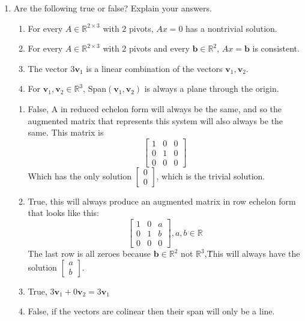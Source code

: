 \documentclass[12pt,a4paper]{exam}
\newcommand{\bb}{\mathbf{b}}
\newcommand{\bv}{\mathbf{v}}
\newcommand{\R}{\mathbb{R}}
\begin{document}
\begin{enumerate}
\item
 Are the following true or false? Explain your answers.
\begin{enumerate}
\item
 For every $A\in\R^{2\times 3}$ with $2$ pivots, $Ax=0$ has a nontrivial solution.
  
\item
 For every $A\in\R^{2\times 3}$ with $2$ pivots and every $\bb\in\R^2$, $Ax=\bb$ is consistent.

\item
 The vector $3\bv_1$ is a linear combination of the vectors $\bv_1,\bv_2$.

\item
 For $\bv_1,\bv_2\in\mathbb{R}^3$, Span$(\bv_1,\bv_2)$ is always a plane 
 through the origin.
\end{enumerate}


\begin{solution}
  \begin{enumerate}
    \item False, A in reduced echelon form will always be the same, and so the augmented matrix that represents this system will also always be the same. This matrix is $$\left[\begin{matrix}1&0&0\\0&1&0\\0&0&0 \end{matrix}\right]$$
          Which has the only solution $\left[\begin{matrix} 0\\0 \end{matrix}\right]$, which is the trivial solution.
    \item True, this will always produce an augmented matrix in row echelon form that looks like this: $$\left[\begin{matrix}1&0&a\\0&1&b\\0&0&0 \end{matrix}\right], a,b\in\R$$
          The last row is all zeroes because $\bb\in\R^2$ not $\R^3$,\. This will always have the solution $\left[\begin{matrix} a\\b \end{matrix}\right]$.
    \item True, $3\bv_1+0\bv_2=3\bv_1$
    \item False, if the vectors are colinear then their span will only be a line.
  \end{enumerate}
\end{solution}



\end{enumerate}
\end{document}
